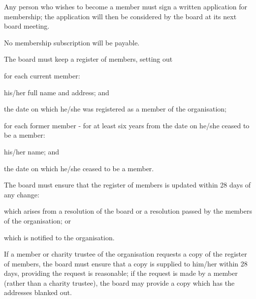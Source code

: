 ﻿\documentclass[a4paper,11pt,onecolumn ]{article}
\begin{document}

\begin{legal} %
\item Any person who wishes to become a member must sign a written application for membership; the application will then be considered by the board at its next board meeting.
\end{legal}



\begin{legal} %
\item No membership subscription will be payable.
\end{legal}


\begin{legal}
\item The board must keep a register of members, setting out 
    \begin{legal}
        \item for each current member:
            \begin{legal}
            \item his/her full name and address; and
            \item the date on which he/she was registered as a member of the organisation; 
            \end{legal}
        \item for each former member - for at least six years from the date on he/she ceased to be a member:
            \begin{legal}
            \item his/her name; and
            \item the date on which he/she ceased to be a member. 
            \end{legal}
    \end{legal}
\item The board must ensure that the register of members is updated within 28 days of any change:
    \begin{legal}
        \item which arises from a resolution of the board or a resolution passed by the members of the organisation; or 
        \item which is notified to the organisation.
    \end{legal}

\item If a member or charity trustee of the organisation requests a copy of the register of members, the board must ensure that a copy is supplied to him/her within 28 days, providing the request is reasonable; if the request is made by a member (rather than a charity trustee), the board may provide a copy which has the addresses blanked out.
\end{legal}
\end{document}
